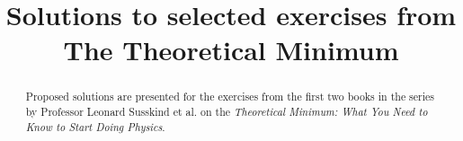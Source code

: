 \documentclass{report}
\title{Solutions to selected exercises from The Theoretical Minimum}
\begin{document}
\maketitle

\begin{abstract}
	Proposed solutions are presented for the exercises from the first two books \cite{TM, QM} in the series by Professor Leonard Susskind et al. on the \emph{Theoretical Minimum: What You Need to Know to Start Doing Physics}.
\end{abstract}

\tableofcontents
{}



\begin{appendices}
	
\end{appendices}


\appendix


\listoftheorems[title={List of Exercises and Results}, onlynamed={answer, definition, remark, proposition, law, lemma, theorem, corollary}]

\printbibliography[heading=bibintoc]
\end{document}
